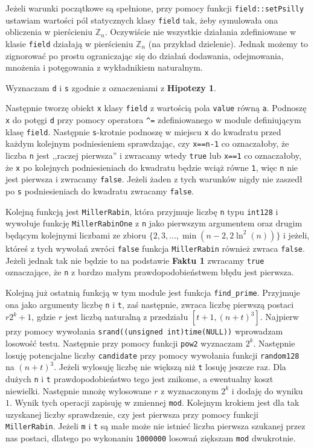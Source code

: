 \documentclass{article}
\begin{document}
Jeżeli warunki początkowe są spełnione, przy pomocy funkcji \texttt{field::setPsilly} ustawiam wartości pól statycznych klasy 
\texttt{field} tak, żeby symulowała
ona obliczenia w pierścieniu $\mathbb{Z}_n$. Oczywiście nie wszystkie działania zdefiniowane
w klasie \texttt{field} działają w pierścieniu $\mathbb{Z}_n$ (na przykład dzielenie). Jednak
możemy to zignorować po prostu ograniczając się do działań dodawania, odejmowania, mnożenia i potęgowania
z wykładnikiem naturalnym.

Wyznaczam \texttt{d} i \texttt{s} zgodnie z oznaczeniami z \textbf{Hipotezy 1}.

Następnie tworzę obiekt \texttt{x} klasy \texttt{field} z wartością pola \texttt{value} równą \texttt{a}.
Podnoszę \texttt{x} do potęgi \texttt{d} przy pomocy operatora \verb!^!\texttt{=} zdefiniowanego w module definiującym klasę \texttt{field}.
Następnie \texttt{s}-krotnie podnoszę w miejscu \texttt{x} do kwadratu przed każdym kolejnym podniesieniem sprawdzając, czy \texttt{x==n-1} 
co oznaczałoby, że liczba \texttt{n} jest ,,raczej pierwsza'' i zwracamy wtedy \texttt{true} lub \texttt{x==1} co oznaczałoby, że \texttt{x} po kolejnych podniesieniach do kwadratu
będzie wciąż równe \texttt{1}, więc \texttt{n} nie jest pierwsza i zwracamy \texttt{false}. Jeżeli żaden z tych warunków nigdy nie zaszedł 
po \texttt{s} podniesieniach do kwadratu zwracamy \texttt{false}.

Kolejną funkcją jest \texttt{MillerRabin}, która przyjmuje liczbę \texttt{n} typu \texttt{\texttt{\textunderscore \textunderscore int128}} i 
wywołuje funkcję \texttt{MillerRabinOne} z \texttt{n} jako pierwszym argumentem oraz drugim będącym kolejnymi liczbami ze zbioru
$\{2,3,...,\min(n-2, 2\ln^2(n))\}$ i jeżeli, któreś z tych wywołań zwróci \texttt{false} funkcja \texttt{MillerRabin} również 
zwraca \texttt{false}. Jeżeli jednak tak nie będzie to na podstawie \textbf{Faktu 1} zwracamy \texttt{true} oznaczające, że 
\texttt{n} z bardzo małym prawdopodobieństwem błędu jest pierwsza. 

Kolejną już ostatnią funkcją w tym module jest funkcja \texttt{find\_prime}. Przyjmuje ona jako argumenty liczbę \texttt{n} i 
\texttt{t}, zaś następnie, zwraca liczbę pierwszą postaci $r2^k+1$, gdzie $r$ jest liczbą naturalną z przedziału $[t+1,(n+t)^3]$.
Najpierw przy pomocy wywołania \texttt{srand((unsigned int)time(NULL))} wprowadzam losowość testu. 
Następnie przy pomocy funkcji \texttt{pow2} wyznaczam $2^k$. Następnie losuję potencjalne liczby \texttt{candidate} przy pomocy wywołania
funkcji \texttt{random128} na $(n+t)^3$. Jeżeli wylosuję liczbę nie większą niż \texttt{t} losuję jeszcze raz. Dla dużych \texttt{n} i \texttt{t}
prawdopodobieństwo tego jest znikome, a ewentualny koszt niewielki. Następnie mnożę
wylosowane $r$ z wyznaczonym $2^k$ i dodaję do wyniku $1$. Wynik tych operacji zapisuję w zmiennej \texttt{mod}.
Kolejnym krokiem jest dla tak uzyskanej liczby sprawdzenie, czy 
jest pierwsza przy pomocy funkcji \texttt{MillerRabin}. Jeżeli \texttt{m} i \texttt{t} są małe  może nie istnieć liczba pierwsza szukanej przez nas postaci, 
dlatego po wykonaniu \texttt{1000000} losowań ziększam \texttt{mod} dwukrotnie.
\end{document}
